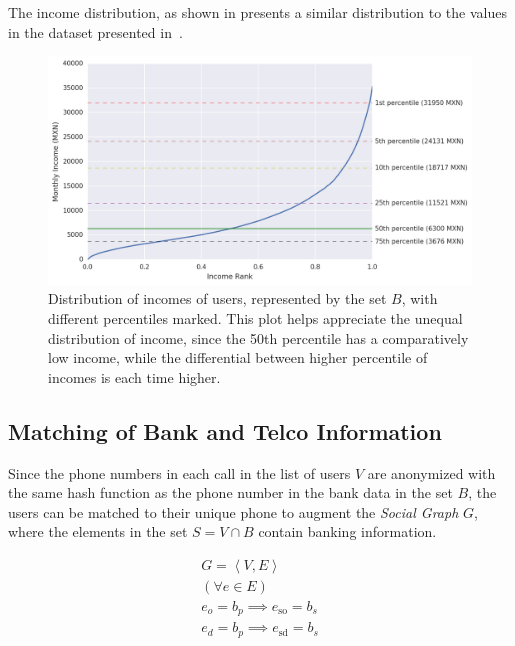 The income distribution, as shown in  presents a similar distribution to the values in the dataset presented in~.

\begin{figure}
\raggedright{}
\includegraphics[width=1.15\textwidth]{figures/incomedistribution.png}
\caption{Distribution of incomes of users, represented by the set $B$, with different percentiles marked. This plot helps appreciate the unequal distribution of income, since the 50th percentile has a comparatively low income, while the differential between higher percentile of incomes is each time higher.}
\label{fig:incomedistribution}
\end{figure}

\subsection{Matching of Bank and Telco Information}
\label{subsec:banktencomathing}

Since the phone numbers in each call in the list of users $V$ are anonymized with the same hash function as the phone number in the bank data in the set $B$, the users can be matched to their unique phone to augment the \emph{Social Graph} $G$, where the elements in the set $S = V \cap B$ contain banking information.

\begin{equation}
\label{eq:banktelcojoin}
\begin{gathered}
G = \left< V, E \right> \\
( \forall e \in E ) \\
e_o = b_p \implies e_{\operatorname{so}} = b_s \\
e_d = b_p \implies e_{\operatorname{sd}} = b_s \\
\end{gathered}
\end{equation}

